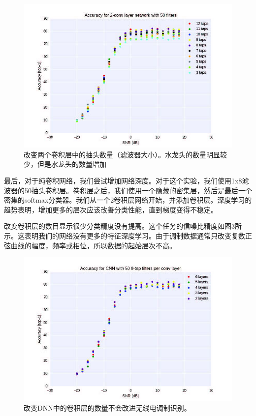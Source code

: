 \begin{figure}[!h]
	\centering
	\includegraphics[scale=1]{figures/chapter_5/fig2}
	\caption{改变两个卷积层中的抽头数量（滤波器大小）。水龙头的数量明显较少，但是水龙头的数量增加}\label{fig_5_2}
\end{figure}

最后，对于纯卷积网络，我们尝试增加网络深度。对于这个实验，我们使用1x8滤波器的50抽头卷积层。卷积层之后，我们使用一个隐藏的密集层，然后是最后一个密集的softmax分类器。我们从一个2卷积层网络开始，并添加卷积层。深度学习的趋势表明，增加更多的层次应该改善分类性能，直到梯度变得不稳定。\par

改变卷积层的数目显示很少分类精度没有提高。这个任务的信噪比精度如图3所示。这表明我们的网络没有更多的特征深度学习。由于调制数据通常只改变复数正弦曲线的幅度，频率或相位，所以数据的起始层次不高。

\begin{figure}[!h]
	\centering
	\includegraphics[scale=1]{figures/chapter_5/fig3}
	\caption{改变DNN中的卷积层的数量不会改进无线电调制识别。}
\end{figure}


